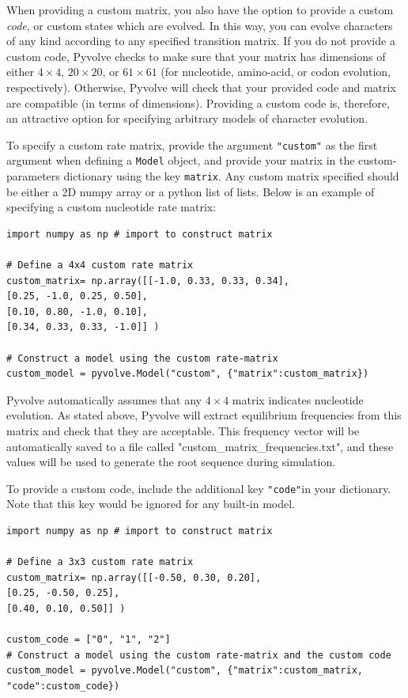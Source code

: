 \documentclass{article}
\newcommand{\code}[1]{\texttt{\small{#1}}}
\begin{document}
When providing a custom matrix, you also have the option to provide a custom \emph{code}, or custom states which are evolved. In this way, you can evolve characters of any kind according to any specified transition matrix. If you do not provide a custom code, Pyvolve checks to make sure that your matrix has dimensions of either $4\times4$, $20\times20$, or $61\times61$ (for nucleotide, amino-acid, or codon evolution, respectively). Otherwise, Pyvolve will check that your provided code and matrix are compatible (in terms of dimensions). Providing a custom code is, therefore, an attractive option for specifying arbitrary models of character evolution.

To specify a custom rate matrix, provide the argument \code{"custom"} as the first argument when defining a \code{Model} object, and provide your matrix in the custom-parameters dictionary using the key \code{matrix}. Any custom matrix specified should be either a 2D numpy array or a python list of lists. Below is an example of specifying a custom nucleotide rate matrix:
\begin{lstlisting}
import numpy as np # import to construct matrix

# Define a 4x4 custom rate matrix
custom_matrix= np.array([[-1.0, 0.33, 0.33, 0.34], 
[0.25, -1.0, 0.25, 0.50], 
[0.10, 0.80, -1.0, 0.10],
[0.34, 0.33, 0.33, -1.0]] )

# Construct a model using the custom rate-matrix
custom_model = pyvolve.Model("custom", {"matrix":custom_matrix})
\end{lstlisting}
Pyvolve automatically assumes that any $4\times4$ matrix indicates nucleotide evolution. As stated above, Pyvolve will extract equilibrium frequencies from this matrix and check that they are acceptable. This frequency vector will be automatically saved to a file called "custom\_matrix\_frequencies.txt", and these values will be used to generate the root sequence during simulation.

To provide a custom code, include the additional key \code{"code"}in your dictionary. Note that this key would be ignored for any built-in model.
\begin{lstlisting}
import numpy as np # import to construct matrix

# Define a 3x3 custom rate matrix
custom_matrix= np.array([[-0.50, 0.30, 0.20], 
[0.25, -0.50, 0.25], 
[0.40, 0.10, 0.50]] )

custom_code = ["0", "1", "2"]
# Construct a model using the custom rate-matrix and the custom code
custom_model = pyvolve.Model("custom", {"matrix":custom_matrix, "code":custom_code})
\end{lstlisting}
\end{document}
